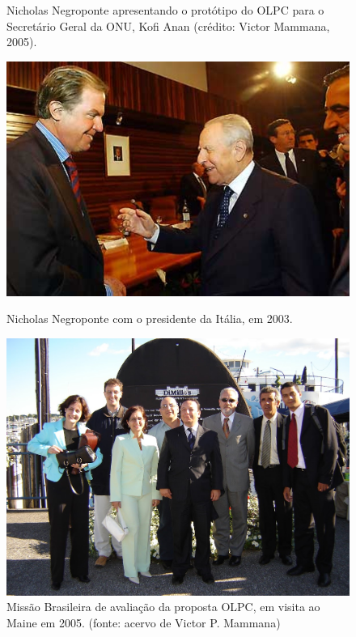 \begin{figure}[htb]
\begin{minipage}[b]{0.4\linewidth}
                \caption{Nicholas Negroponte apresentando o protótipo do OLPC para o Secretário Geral da ONU, Kofi Anan (crédito: Victor Mammana, 2005).}
                \label{31f6206a8e4662597d5a134974d64a4696f4129c}
\end{minipage}
\hspace{0.5cm}
\begin{minipage}[b]{0.4\linewidth}
        \centering
                \includegraphics[width=1.0\linewidth]{../../../imagens/presidente-italia.jpg}
                \caption{Nicholas Negroponte com o presidente da Itália, em 2003.}
                \label{f15f5d2fa7b78d2e6dec6ac4a7be76d564c9bf71}
\end{minipage}%
\hspace{0.5cm}
\begin{minipage}[b]{0.4\linewidth}
        \centering
                \includegraphics[width=1.0\linewidth]{../../../imagens/equipeOLPC.jpg}
                \caption{Missão Brasileira de avaliação da proposta OLPC, em visita ao Maine em 2005. (fonte: acervo de Victor P. Mammana)}
                \label{b1b538b3cf66c3aaf3d7a74aac4332a1f40be14d}
\end{minipage}
\hspace{0.5cm}
\end{figure}



